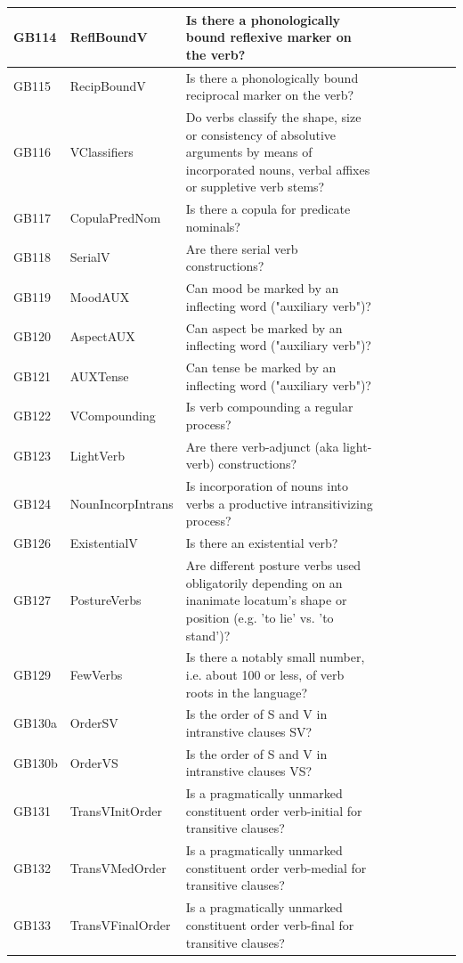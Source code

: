 \documentclass[draft,10pt]{article} %
\begin{document}
\begin{landscape}
\begin{longtable}{| l | p{4cm}| p{12cm}|p{2cm}|p{2cm}|p{2cm}|p{2cm}|p{2cm}|p{2cm}|}
GB114 & ReflBoundV&Is there a phonologically bound reflexive marker on the verb?\\ \hline
GB115 & RecipBoundV&Is there a phonologically bound reciprocal marker on the verb?\\ \hline
GB116 & VClassifiers&Do verbs classify the shape, size or consistency of absolutive arguments by means of incorporated nouns, verbal affixes or suppletive verb stems?\\ \hline
GB117 & CopulaPredNom&Is there a copula for predicate nominals?\\ \hline
GB118 & SerialV&Are there serial verb constructions?\\ \hline
GB119 & MoodAUX&Can mood be marked by an inflecting word ("auxiliary verb")?\\ \hline
GB120 & AspectAUX&Can aspect be marked by an inflecting word ("auxiliary verb")?\\ \hline
GB121 & AUXTense&Can tense be marked by an inflecting word ("auxiliary verb")?\\ \hline
GB122 & VCompounding&Is verb compounding a regular process?\\ \hline
GB123 & LightVerb&Are there verb-adjunct (aka light-verb) constructions?\\ \hline
GB124 & NounIncorpIntrans&Is incorporation of nouns into verbs a productive intransitivizing process?\\ \hline
GB126 & ExistentialV&Is there an existential verb?\\ \hline
GB127 & PostureVerbs&Are different posture verbs used obligatorily depending on an inanimate locatum's shape or position (e.g. 'to lie' vs. 'to stand')?\\ \hline
GB129 & FewVerbs&Is there a notably small number, i.e. about 100 or less, of verb roots in the language?\\ \hline
GB130a & OrderSV&Is the order of S and V in intranstive clauses SV?\\ \hline
GB130b & OrderVS&Is the order of S and V in intranstive clauses VS?\\ \hline
GB131 & TransVInitOrder&Is a pragmatically unmarked constituent order verb-initial for transitive clauses?\\ \hline
GB132 & TransVMedOrder&Is a pragmatically unmarked constituent order verb-medial for transitive clauses?\\ \hline
GB133 & TransVFinalOrder&Is a pragmatically unmarked constituent order verb-final for transitive clauses?\\ \hline

\end{longtable}
\end{landscape}
\end{document}
